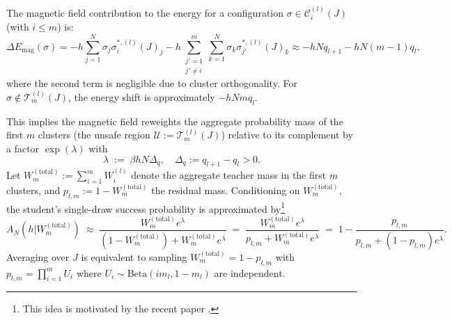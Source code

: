 \documentclass{article}
\theoremstyle{remark} %
\begin{document}
The magnetic field contribution to the energy for a configuration $\sigma \in \mathcal{C}^{(l)}_i(J)$ (with $i \leq m$) is:
\begin{equation}
\Delta E_{\text{mag}}(\sigma) = -h \sum_{j=1}^N \sigma_j \sigma^{\ast,(l)}_i(J)_j - h\sum_{\substack{j'=1\\j' \neq i}}^m \sum_{k=1}^N \sigma_k \sigma^{\ast,(l)}_{j'}(J)_k \approx -hN q_{l+1}-hN(m-1)q_l,
\end{equation}
where the second term is negligible due to cluster orthogonality. For $\sigma \notin \mathcal{T}^{(l)}_m(J)$, the energy shift is approximately $-hNmq_l$.

This implies the magnetic field reweights the aggregate probability mass of the first $m$ clusters (the unsafe region $\mathcal{U} := \mathcal{T}^{(l)}_m(J)$) relative to
its complement by a factor $\exp(\lambda)$ with
\begin{equation}
\lambda\;:=\;\beta h N\Delta_q, \quad \Delta_q:=q_{l+1}-q_{l}>0.
\end{equation}
Let $W_m^{(\text{total})} := \sum_{i=1}^m W^{(l)}_i$ denote the aggregate teacher mass in the first $m$ clusters, and $p_{l,m} := 1 - W_m^{(\text{total})}$ the residual mass. Conditioning on $W_m^{(\text{total})}$, the student's single-draw
success probability is approximated by\footnote{This idea is motivated by the recent paper \cite{aguilar2024small}. }
\begin{equation}
A_N(h \vert W_m^{(\text{total})})\;\approx\;\frac{W_m^{(\text{total})} e^{\lambda}}{(1-W_m^{(\text{total})})+W_m^{(\text{total})} e^{\lambda}}
\;=\;\frac{W_m^{(\text{total})} e^{\lambda}}{p_{l,m}+W_m^{(\text{total})} e^{\lambda}}
\;=\;1-\frac{p_{l,m}}{p_{l,m}+(1-p_{l,m}) e^{\lambda}}.
\label{eq:tilt_single}
\end{equation}
Averaging over $J$ is equivalent to sampling $W_m^{(\text{total})} = 1 - p_{l,m}$ with $p_{l,m} = \prod_{i=1}^m U_i$ where $U_i \sim \text{Beta}(im_l, 1-m_l)$ are independent. 
\end{document}
